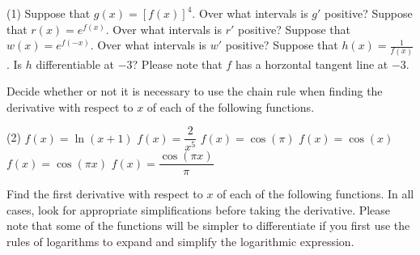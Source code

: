 \documentclass[12pt,]{book}
\theoremstyle{plain}
\theoremstyle{definition}
\numberwithin{equation}{section}
\newcommand{\fe}[2]{#1\mathopen{}\left(#2\right)\mathclose{}}
\newcommand{\fd}[1]{#1'}
\begin{document}
\par
\begin{exercisegroup}(1)
\exercise[6.]\hypertarget{exercise-487}{\null}Suppose that \(\fe{g}{x}=\left[\fe{f}{x}\right]^4\). Over what intervals is \(\fd{g}\) positive?%
\exercise[7.]\hypertarget{exercise-488}{\null}Suppose that \(\fe{r}{x}=e^{\fe{f}{x}}\). Over what intervals is \(\fd{r}\) positive?%
\exercise[8.]\hypertarget{exercise-489}{\null}Suppose that \(\fe{w}{x}=e^{\fe{f}{-x}}\). Over what intervals is \(\fd{w}\) positive?%
\exercise[9.]\hypertarget{exercise-490}{\null}Suppose that \(\fe{h}{x}=\frac{1}{\fe{f}{x}}\). Is \(h\) differentiable at \(-3\)? Please note that \(f\) has a horzontal tangent line at \(-3\).%
\end{exercisegroup}
\par\smallskip\noindent
\hypertarget{exercisegroup-102}{\null}Decide whether or not it is necessary to use the chain rule when finding the derivative with respect to \(x\) of each of the following functions.%
\par
\begin{exercisegroup}(2)
\exercise[10.]\hypertarget{exercise-491}{\null}\(\fe{f}{x}=\fe{\ln}{x+1}\)%
\exercise[11.]\hypertarget{exercise-492}{\null}\(\fe{f}{x}=\dfrac{2}{x^5}\)%
\exercise[12.]\hypertarget{exercise-493}{\null}\(\fe{f}{x}=\fe{\cos}{\pi}\)%
\exercise[13.]\hypertarget{exercise-494}{\null}\(\fe{f}{x}=\fe{\cos}{x}\)%
\exercise[14.]\hypertarget{exercise-495}{\null}\(\fe{f}{x}=\fe{\cos}{\pi x}\)%
\exercise[15.]\hypertarget{exercise-496}{\null}\(\fe{f}{x}=\dfrac{\fe{\cos}{\pi x}}{\pi}\)%
\end{exercisegroup}
\par\smallskip\noindent
\hypertarget{exercisegroup-103}{\null}Find the first derivative with respect to \(x\) of each of the following functions.  In all cases, look for appropriate simplifications before taking the derivative.  Please note that some of the functions will be simpler to differentiate if you first use the rules of logarithms to expand and simplify the logarithmic expression.%
\par
\end{document}
